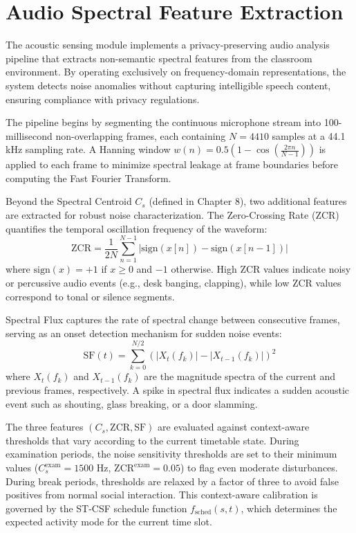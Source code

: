 \documentclass[12pt,a4paper,oneside]{report}
\begin{document}
\section{Audio Spectral Feature Extraction}
The acoustic sensing module implements a privacy-preserving audio analysis pipeline that extracts non-semantic spectral features from the classroom environment. By operating exclusively on frequency-domain representations, the system detects noise anomalies without capturing intelligible speech content, ensuring compliance with privacy regulations.

The pipeline begins by segmenting the continuous microphone stream into 100-millisecond non-overlapping frames, each containing $N = 4410$ samples at a 44.1 kHz sampling rate. A Hanning window $w(n) = 0.5\left(1 - \cos\left(\frac{2\pi n}{N-1}\right)\right)$ is applied to each frame to minimize spectral leakage at frame boundaries before computing the Fast Fourier Transform.

Beyond the Spectral Centroid $C_s$ (defined in Chapter 8), two additional features are extracted for robust noise characterization. The Zero-Crossing Rate (ZCR) quantifies the temporal oscillation frequency of the waveform:
\begin{equation}
    \text{ZCR} = \frac{1}{2N} \sum_{n=1}^{N-1} \left| \text{sign}(x[n]) - \text{sign}(x[n-1]) \right|
\end{equation}
where $\text{sign}(x) = +1$ if $x \geq 0$ and $-1$ otherwise. High ZCR values indicate noisy or percussive audio events (e.g., desk banging, clapping), while low ZCR values correspond to tonal or silence segments.

Spectral Flux captures the rate of spectral change between consecutive frames, serving as an onset detection mechanism for sudden noise events:
\begin{equation}
    \text{SF}(t) = \sum_{k=0}^{N/2} \left( |X_t(f_k)| - |X_{t-1}(f_k)| \right)^2
\end{equation}
where $X_t(f_k)$ and $X_{t-1}(f_k)$ are the magnitude spectra of the current and previous frames, respectively. A spike in spectral flux indicates a sudden acoustic event such as shouting, glass breaking, or a door slamming.

The three features $(C_s, \text{ZCR}, \text{SF})$ are evaluated against context-aware thresholds that vary according to the current timetable state. During examination periods, the noise sensitivity thresholds are set to their minimum values ($C_s^{\text{exam}} = 1500$ Hz, $\text{ZCR}^{\text{exam}} = 0.05$) to flag even moderate disturbances. During break periods, thresholds are relaxed by a factor of three to avoid false positives from normal social interaction. This context-aware calibration is governed by the ST-CSF schedule function $f_{\text{sched}}(s, t)$, which determines the expected activity mode for the current time slot.
\end{document}
